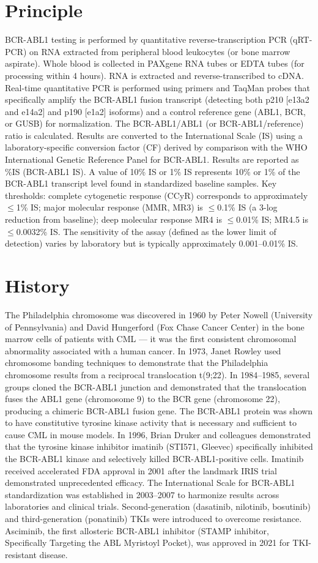 \section*{Principle}
BCR-ABL1 testing is performed by quantitative reverse-transcription PCR (qRT-PCR) on RNA extracted from peripheral blood leukocytes (or bone marrow aspirate). Whole blood is collected in PAXgene RNA tubes or EDTA tubes (for processing within 4 hours). RNA is extracted and reverse-transcribed to cDNA. Real-time quantitative PCR is performed using primers and TaqMan probes that specifically amplify the BCR-ABL1 fusion transcript (detecting both p210 [e13a2 and e14a2] and p190 [e1a2] isoforms) and a control reference gene (ABL1, BCR, or GUSB) for normalization. The BCR-ABL1/ABL1 (or BCR-ABL1/reference) ratio is calculated. Results are converted to the International Scale (IS) using a laboratory-specific conversion factor (CF) derived by comparison with the WHO International Genetic Reference Panel for BCR-ABL1. Results are reported as \%IS (BCR-ABL1 IS). A value of 10\% IS or 1\% IS represents 10\% or 1\% of the BCR-ABL1 transcript level found in standardized baseline samples. Key thresholds: complete cytogenetic response (CCyR) corresponds to approximately $\leq$1\% IS; major molecular response (MMR, MR3) is $\leq$0.1\% IS (a 3-log reduction from baseline); deep molecular response MR4 is $\leq$0.01\% IS; MR4.5 is $\leq$0.0032\% IS. The sensitivity of the assay (defined as the lower limit of detection) varies by laboratory but is typically approximately 0.001--0.01\% IS.

\section*{History}
The Philadelphia chromosome was discovered in 1960 by Peter Nowell (University of Pennsylvania) and David Hungerford (Fox Chase Cancer Center) in the bone marrow cells of patients with CML --- it was the first consistent chromosomal abnormality associated with a human cancer. In 1973, Janet Rowley used chromosome banding techniques to demonstrate that the Philadelphia chromosome results from a reciprocal translocation t(9;22). In 1984--1985, several groups cloned the BCR-ABL1 junction and demonstrated that the translocation fuses the ABL1 gene (chromosome 9) to the BCR gene (chromosome 22), producing a chimeric BCR-ABL1 fusion gene. The BCR-ABL1 protein was shown to have constitutive tyrosine kinase activity that is necessary and sufficient to cause CML in mouse models. In 1996, Brian Druker and colleagues demonstrated that the tyrosine kinase inhibitor imatinib (STI571, Gleevec) specifically inhibited the BCR-ABL1 kinase and selectively killed BCR-ABL1-positive cells. Imatinib received accelerated FDA approval in 2001 after the landmark IRIS trial demonstrated unprecedented efficacy. The International Scale for BCR-ABL1 standardization was established in 2003--2007 to harmonize results across laboratories and clinical trials. Second-generation (dasatinib, nilotinib, bosutinib) and third-generation (ponatinib) TKIs were introduced to overcome resistance. Asciminib, the first allosteric BCR-ABL1 inhibitor (STAMP inhibitor, Specifically Targeting the ABL Myristoyl Pocket), was approved in 2021 for TKI-resistant disease.

